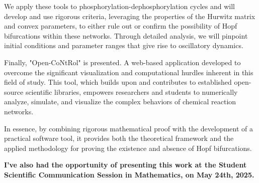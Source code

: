 We apply these tools to phosphorylation-dephosphorylation cycles and will develop and use rigorous criteria, leveraging the properties of the Hurwitz matrix and convex parameters, to either rule out or confirm the possibility of Hopf bifurcations within these networks. Through detailed analysis, we will pinpoint initial conditions and parameter ranges that give rise to oscillatory dynamics.

Finally, "Open-CoNtRol" is presented. A web-based application developed to overcome the significant visualization and computational hurdles inherent in this field of study. This tool, which builds upon and contributes to established open-source scientific libraries, empowers researchers and students to numerically analyze, simulate, and visualize the complex behaviors of chemical reaction networks.

In essence,  by combining rigorous mathematical proof with the development of a practical software tool, it provides both the theoretical framework and the applied methodology for proving the existence and absence of Hopf bifurcations.

\textbf{
	I've also had the opportunity of presenting this work at the Student Scientific Communication Session in Mathematics, on May 24th, 2025.
}